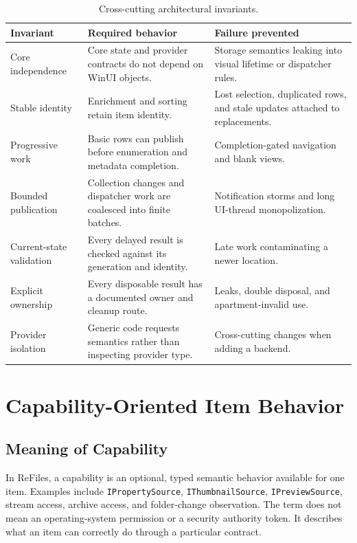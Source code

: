\documentclass[10pt,a4paper,twoside]{article}
\begin{document}
\begin{table}[htbp]
  \centering
  \small
  \caption{Cross-cutting architectural invariants.}
  \label{table:invariants}
  \begin{tabularx}{\textwidth}{@{}p{}YY@{}}
    \toprule
    Invariant & Required behavior & Failure prevented \\
    \midrule
    Core independence & Core state and provider contracts do not depend on WinUI objects. & Storage semantics leaking into visual lifetime or dispatcher rules. \\
    Stable identity & Enrichment and sorting retain item identity. & Lost selection, duplicated rows, and stale updates attached to replacements. \\
    Progressive work & Basic rows can publish before enumeration and metadata completion. & Completion-gated navigation and blank views. \\
    Bounded publication & Collection changes and dispatcher work are coalesced into finite batches. & Notification storms and long UI-thread monopolization. \\
    Current-state validation & Every delayed result is checked against its generation and identity. & Late work contaminating a newer location. \\
    Explicit ownership & Every disposable result has a documented owner and cleanup route. & Leaks, double disposal, and apartment-invalid use. \\
    Provider isolation & Generic code requests semantics rather than inspecting provider type. & Cross-cutting changes when adding a backend. \\
    \bottomrule
  \end{tabularx}
\end{table}

\section{Capability-Oriented Item Behavior}
\label{section:capabilities}

\subsection{Meaning of Capability}

In ReFiles, a capability is an optional, typed semantic behavior available for one item. Examples include
\texttt{IPropertySource}, \texttt{IThumbnailSource}, \texttt{IPreviewSource}, stream access, archive access, and
folder-change observation. The term does not mean an operating-system permission or a security authority token.
It describes what an item can correctly do through a particular contract.
\end{document}
